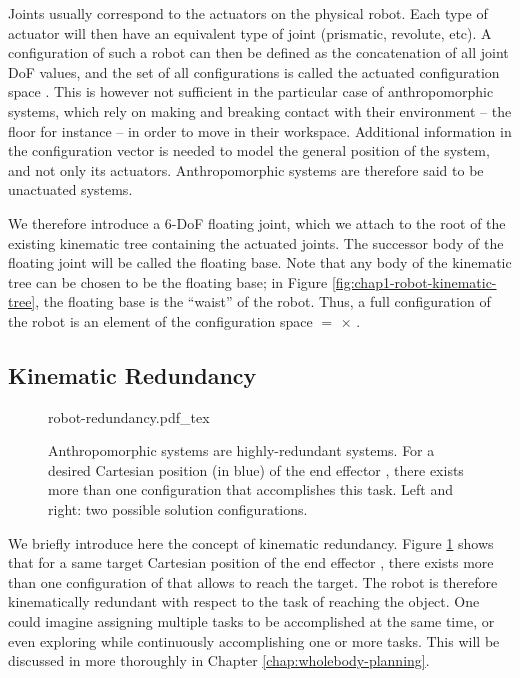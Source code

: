 Joints usually correspond to the actuators on the physical robot. Each
type of actuator will then have an equivalent type of joint
(prismatic, revolute, etc). A configuration \config{} of such a robot
can then be defined as the concatenation of all joint DoF values, and
the set of all configurations is called the actuated configuration
space \actcspace. This is however not sufficient in the particular
case of anthropomorphic systems, which rely on making and breaking
contact with their environment -- the floor for instance -- in order
to move in their workspace. Additional information in the
configuration vector is needed to model the general position of the
system, and not only its actuators. Anthropomorphic systems are
therefore said to be unactuated systems.

We therefore introduce a 6-DoF floating joint, which we attach to the
root of the existing kinematic tree containing the actuated
joints. The successor body of the floating joint will be called the
floating base. Note that any body of the kinematic tree can be chosen
to be the floating base; in Figure
\ref{fig:chap1-robot-kinematic-tree}, the floating base is the
``waist'' of the robot. Thus, a full configuration \config{} of the
robot \robot is an element of the configuration space \cspace $=$
\segroup $\times$ \actcspace.
 
\subsection{Kinematic Redundancy}
\label{subsec:chap1-kinematic-redundancy}

\begin{figure}
  \centering
      {\def\svgwidth{0.8\linewidth}
        
                   {robot-redundancy.pdf_tex}}
      \caption{Anthropomorphic systems are highly-redundant
        systems. For a desired Cartesian position (in blue) of the end
        effector , there exists more than one configuration
        \config{} that accomplishes this task. Left and right: two
        possible solution configurations.}
      \label{fig:chap1-robot-redundancy}
\end{figure}

We briefly introduce here the concept of kinematic redundancy. Figure
\ref{fig:chap1-robot-redundancy} shows that for a same target
Cartesian position of the end effector , there exists more
than one configuration of \robot that allows  to reach the
target. The robot \robot is therefore kinematically redundant with
respect to the task of reaching the object. One could imagine
assigning multiple tasks to be accomplished at the same time, or even
exploring \cspace while continuously accomplishing one or more
tasks. This will be discussed in more thoroughly in Chapter
\ref{chap:wholebody-planning}.

